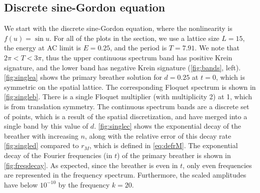 \documentclass[12pt,reqno]{amsart}
\theoremstyle{definition}
\begin{document}
\subsection{Discrete sine-Gordon equation}

We start with the discrete sine-Gordon equation, where the nonlinearity is $f(u) = \sin u$. For all of the plots in the section, we use a lattice size $L = 15$, the energy at AC limit is $E = 0.25$, and the period is $T = 7.91$. We note that $2 \pi < T < 3 \pi$, thus the upper continuous spectrum band has positive Krein signature, and the lower band has negative Krein signature (\cref{fig:bands}, left).
\cref{fig:singlea} shows the primary breather solution for $d = 0.25$ at $t = 0$, which is symmetric on the spatial lattice. The corresponding Floquet spectrum is shown in \cref{fig:singleb}. There is a single Floquet multiplier (with multiplicity 2) at 1, which is from translation symmetry. The continuous spectrum bands are a discrete set of points, which is a result of the spatial discretization, and have merged into a single band by this value of $d$. \cref{fig:singlec} shows the exponential decay of the breather with increasing $n$, along with the relative error of this decay rate \cref{fig:singled} compared to $r_M$, which is defined in \cref{eq:defrM}. The exponential decay of the Fourier frequencies (in $t$) of the primary breather is shown in \cref{fig:freqdecay}. As expected, since the breather is even in $t$, only even frequencies are represented in the frequency spectrum. Furthermore, the scaled amplitudes have below $10^{-10}$ by the frequency $k=20$.
\end{document}
